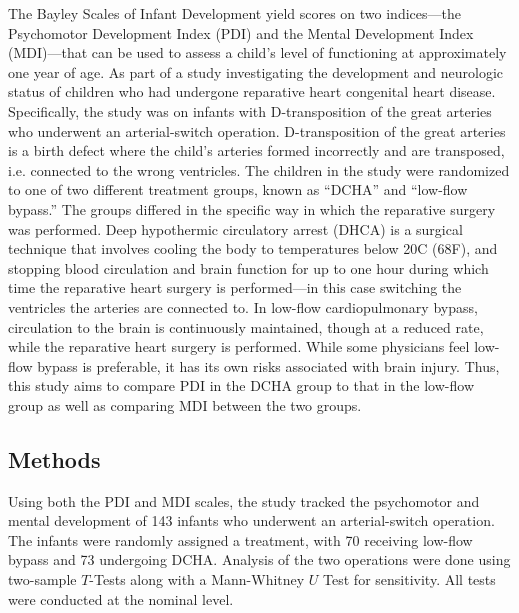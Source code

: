 \documentclass{article}
\begin{document}
\begin{enumerate}
		The Bayley Scales of Infant Development yield scores on two indices---the Psychomotor Development Index (PDI) and the Mental Development Index (MDI)---that can be used to assess a child's level of functioning at approximately one year of age. As part of a study investigating the development and neurologic status of children who had undergone reparative heart congenital heart disease. Specifically, the study was on infants with D-transposition of the great arteries who underwent an arterial-switch operation. D-transposition of the great arteries is a birth defect where the child's arteries formed incorrectly and are transposed, i.e. connected to the wrong ventricles. The children in the study were randomized to one of two different treatment groups, known as ``DCHA'' and ``low-flow bypass.'' The groups differed in the specific way in which the reparative surgery was performed. Deep hypothermic circulatory arrest (DHCA) is a surgical technique that involves cooling the body to temperatures below 20\degree C (68\degree F), and stopping blood circulation and brain function for up to one hour during which time the reparative heart surgery is performed---in this case switching the ventricles the arteries are connected to. In low-flow cardiopulmonary bypass, circulation to the brain is continuously maintained, though at a reduced rate, while the reparative heart surgery is performed. While some physicians feel low-flow bypass is preferable, it has its own risks associated with brain injury. Thus, this study aims to compare PDI in the DCHA group to that in the low-flow group as well as comparing MDI between the two groups.

		\subsection*{Methods}
		Using both the PDI and MDI scales, the study tracked the psychomotor and mental development of 143 infants who underwent an arterial-switch operation. The infants were randomly assigned a treatment, with 70 receiving low-flow bypass and 73 undergoing DCHA. Analysis of the two operations were done using two-sample $T$-Tests along with a Mann-Whitney $U$ Test for sensitivity. All tests were conducted at the nominal level.


\end{enumerate}
\end{document}
